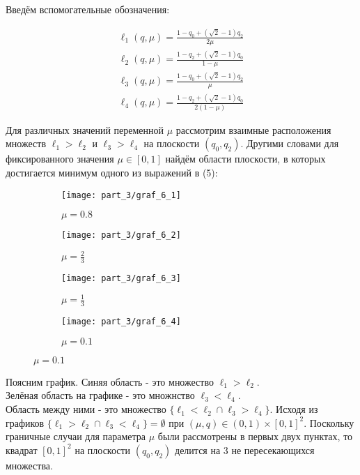 \begin{flushleft}
	Введём вспомогательные обозначения:
	
	\begin{gather*}
		\ell_1(q,\mu)=\frac{1-q_0+(\sqrt{2}-1)q_2}{2\mu} \\
		\ell_2(q,\mu)=\frac{1-q_2+(\sqrt{2}-1)q_0}{1-\mu} \\
		\ell_3(q,\mu)=\frac{1-q_0+(\sqrt{2}-1)q_2}{\mu} \\
		\ell_4(q,\mu)=\frac{1-q_2+(\sqrt{2}-1)q_0}{2(1-\mu)}
	\end{gather*}
	
	
	Для различных значений переменной $\mu$ рассмотрим 
	взаимные расположения множеств $\ell_1>\ell_2$ и $\ell_3>\ell_4$
	на плоскости $(q_0,q_2)$. Другими словами для фиксированного 
	значения $\mu \in [0,1]$ найдём области плоскости, в которых 
	достигается минимум одного из выражений в (5):
	
	\begin{figure}[H]
    	\centering
     	\begin{subfigure}[b]{0.22 \textwidth}
        	\centering
        	\texttt{[image: part\_3/graf\_6\_1]}
        	\caption{$\mu=0.8$}
         	\label{fig:y equals x}
     	\end{subfigure}
     	\hfill
     	\begin{subfigure}[b]{0.22 \textwidth}
        	\centering
        	\texttt{[image: part\_3/graf\_6\_2]}
        	\caption{$\mu=\frac{2}{3}$}
        	\label{fig:three sin x}
     	\end{subfigure}
     	\hfill
     	\begin{subfigure}[b]{0.22 \textwidth}
        	\centering
        	\texttt{[image: part\_3/graf\_6\_3]}
        	\caption{$\mu=\frac{1}{3}$}
        	\label{fig:five over x}
     	\end{subfigure}
     	\hfill
     	\begin{subfigure}[b]{0.22 \textwidth}
        	\centering
        	\texttt{[image: part\_3/graf\_6\_4]}
         	\caption{$\mu=0.1$}
         	\label{fig:five over x}
     	\end{subfigure}
	\end{figure}
	
	Поясним график. Синяя область - это множество $\ell_1 > \ell_2$.\\
	Зелёная область на графике - это множнство $\ell_3 < \ell_4$.\\
	Область между ними - это множество $\{\ell_1<\ell_2 \cap \ell_3 > \ell_4\}$.
	Исходя из графиков $\{\ell_1>\ell_2 \cap \ell_3 < \ell_4\} = \emptyset$ 
	при $(\mu, q) \in (0, 1) \times [0, 1]^2$.
	Поскольку граничные случаи для параметра $\mu$ были рассмотрены в первых
	двух пунктах, то квадрат $[0,1]^2$ на плоскости $(q_0,q_2)$ делится на 3 не 
	пересекающихся множества.
	

\end{flushleft}
